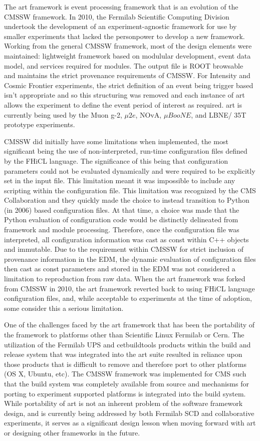 The art framework is event processing framework that is an evolution of the CMSSW framework. In 2010, the Fermilab Scientific Computing Division undertook the development of an experiment-agnostic framework for use by smaller experiments that lacked the personpower to develop a new framework. Working from the general CMSSW framework, most of the design elements were maintained: lightweight framework based on modulular development, event data model, and services required for modules. The output file is ROOT browsable and maintains the strict provenance requirements of CMSSW. For Intensity and Cosmic Frontier experiments, the strict definition of an event being trigger based isn't appropriate and so this structuring was removed and each instance of art allows the experiment to define the event period of interest as required. art is currently being used by the Muon g-2, $\mu2e$, NOvA, $\mu BooNE$, and LBNE/ 35T prototype experiments.

CMSSW did initially have some limitations when implemented, the most significant being the use of non-interpreted, run-time configuration files defined by the FHiCL language. The significance of this being that configuration parameters could not be evaluated dynamically and were required to be explicitly set in the input file. This limitation meant it was impossible to include any scripting within the configuration file. This limitation was recognized by the CMS Collaboration and they quickly made the choice to instead transition to Python (in 2006) based configuration files. At that time, a choice was made that the Python evaluation of configuration code would be distinctly delineated from framework and module processing. Therefore, once the configuration file was interpreted, all configuration information was cast as const within C++ objects and immutable. Due to the requirement within CMSSW for strict inclusion of provenance information in the EDM, the dynamic evaluation of configuration files then cast as const parameters and stored in the EDM was not considered a limitation to reproduction from raw data. When the art framework was forked from CMSSW in 2010, the art framework reverted back to using FHiCL language configuration files, and, while acceptable to experiments at the time of adoption, some consider this a serious limitation.

One of the challenges faced by the art framework that has been the portability of the framework to platforms other than Scientific Linux Fermilab or Cern. The utilization of the Fermilab UPS and cetbuildtools products within the build and release system that was integrated into the art suite resulted in reliance upon those products that is difficult to remove and therefore port to other platforms (OS X, Ubuntu, etc). The CMSSW framework was implemented for CMS such that the build system was completely available from source and mechanisms for porting to experiment supported platforms is integrated into the build system. While portability of art is not an inherent problem of the software framework design, and is currently being addressed by both Fermilab SCD and collaborative experiments, it serves as a significant design lesson when moving forward with art or designing other frameworks in the future.

